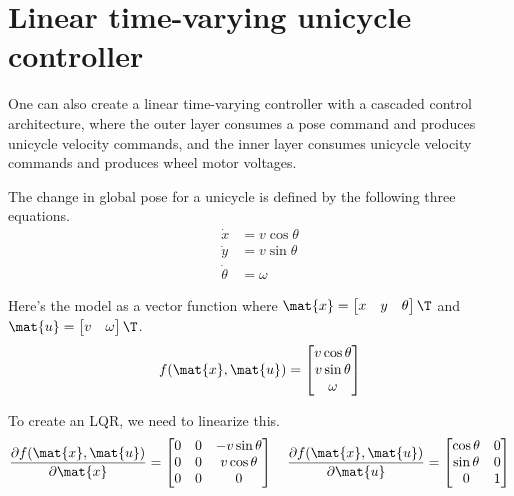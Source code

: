 \section{Linear time-varying unicycle controller}

One can also create a linear time-varying controller with a cascaded control
architecture, where the outer layer consumes a pose command and produces
unicycle velocity commands, and the inner layer consumes unicycle velocity
commands and produces wheel motor voltages.

The change in global pose for a unicycle is defined by the following three
equations.
\begin{align*}
  \dot{x} &= v\cos\theta \\
  \dot{y} &= v\sin\theta \\
  \dot{\theta} &= \omega
\end{align*}

Here's the model as a vector function where
$\mat{x} = \begin{bmatrix} x & y & \theta \end{bmatrix}\T$ and
$\mat{u} = \begin{bmatrix} v & \omega \end{bmatrix}\T$.
\begin{equation}
  f(\mat{x}, \mat{u}) =
  \begin{bmatrix}
    v\cos\theta \\
    v\sin\theta \\
    \omega
  \end{bmatrix}
\end{equation}

To create an LQR, we need to linearize this.
\begin{equation*}
  \frac{\partial f(\mat{x}, \mat{u})}{\partial\mat{x}} =
  \begin{bmatrix}
    0 & 0 & -v\sin\theta \\
    0 & 0 & v\cos\theta \\
    0 & 0 & 0
  \end{bmatrix}
  \quad
  \frac{\partial f(\mat{x}, \mat{u})}{\partial\mat{u}} =
  \begin{bmatrix}
    \cos\theta & 0 \\
    \sin\theta & 0 \\
    0 & 1
  \end{bmatrix}
\end{equation*}

